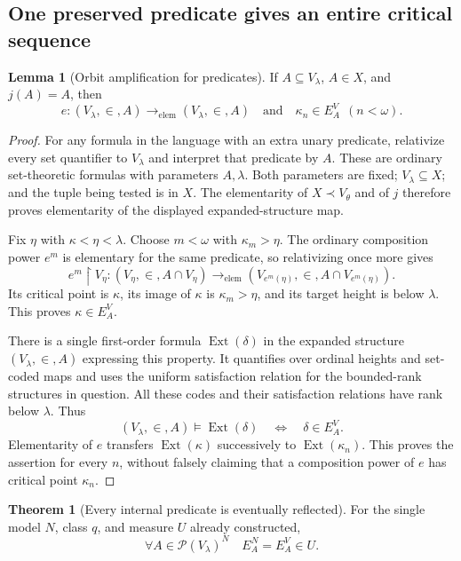 \documentclass[11pt,letterpaper]{article}
\theoremstyle{definition}
\newtheorem{theorem}[definition]{Theorem}
\newtheorem{lemma}[definition]{Lemma}
\numberwithin{equation}{section}
\newcommand{\Pow}{\mathcal P}
\newcommand{\restr}{\mathbin{\upharpoonright}}
\newcommand{\prelem}{\longrightarrow_{\mathrm{elem}}}
\begin{document}
\subsection{One preserved predicate gives an entire critical sequence}

\begin{lemma}[Orbit amplification for predicates]\label{lem:orbit}
If $A\subseteq V_\lambda$, $A\in X$, and $j(A)=A$, then
\[
 e:(V_\lambda,\in,A)\prelem(V_\lambda,\in,A)
 \quad\text{and}\quad \kappa_n\in E_A^V\ \ (n<\omega).
\]
\end{lemma}

\begin{proof}
For any formula in the language with an extra unary predicate, relativize every set quantifier to $V_\lambda$ and interpret that predicate by $A$. These are ordinary set-theoretic formulas with parameters $A,\lambda$. Both parameters are fixed; $V_\lambda\subseteq X$; and the tuple being tested is in $X$. The elementarity of $X\prec V_\theta$ and of $j$ therefore proves elementarity of the displayed expanded-structure map.

Fix $\eta$ with $\kappa<\eta<\lambda$. Choose $m<\omega$ with $\kappa_m>\eta$. The ordinary composition power $e^m$ is elementary for the same predicate, so relativizing once more gives
\[
 e^m\restr V_\eta:
 (V_\eta,\in,A\cap V_\eta)
 \prelem
 (V_{e^m(\eta)},\in,A\cap V_{e^m(\eta)}).
\]
Its critical point is $\kappa$, its image of $\kappa$ is $\kappa_m>\eta$, and its target height is below $\lambda$. This proves $\kappa\in E_A^V$.

There is a single first-order formula $\operatorname{Ext}(\delta)$ in the expanded structure $(V_\lambda,\in,A)$ expressing this property. It quantifies over ordinal heights and set-coded maps and uses the uniform satisfaction relation for the bounded-rank structures in question. All these codes and their satisfaction relations have rank below $\lambda$. Thus
\[
 (V_\lambda,\in,A)\models\operatorname{Ext}(\delta)
 \quad\Longleftrightarrow\quad\delta\in E_A^V.
\]
Elementarity of $e$ transfers $\operatorname{Ext}(\kappa)$ successively to $\operatorname{Ext}(\kappa_n)$. This proves the assertion for every $n$, without falsely claiming that a composition power of $e$ has critical point $\kappa_n$.
\end{proof}

\begin{theorem}[Every internal predicate is eventually reflected]\label{thm:tailE}
For the single model $N$, class $q$, and measure $U$ already constructed,
\[
 \forall A\in\Pow(V_\lambda)^N\quad E_A^N=E_A^V\in U.
\]
\end{theorem}
\end{document}
